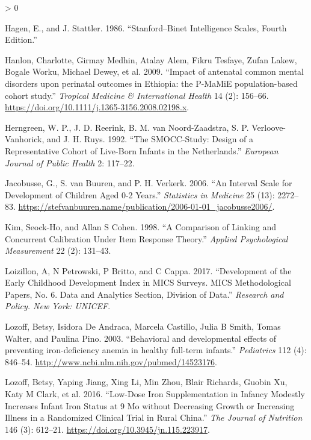 \documentclass[
]{book}
\newlength{\cslhangindent}
\newenvironment{CSLReferences}[2] %
 {%
  \setlength{\parindent}{0pt}
  \ifodd #1 \everypar{\setlength{\hangindent}{\cslhangindent}}\ignorespaces\fi
  \ifnum #2 > 0
  \setlength{\parskip}{#2\baselineskip}
  \fi
 }%
 {}
\begin{document}
\begin{CSLReferences}{1}{0}
\leavevmode\hypertarget{ref-hagen1986}{}%
Hagen, E., and J. Stattler. 1986. {``Stanford--Binet Intelligence Scales, Fourth Edition.''}

\leavevmode\hypertarget{ref-Hanlon2009}{}%
Hanlon, Charlotte, Girmay Medhin, Atalay Alem, Fikru Tesfaye, Zufan Lakew, Bogale Worku, Michael Dewey, et al. 2009. {``{Impact of antenatal common mental disorders upon perinatal outcomes in Ethiopia: the P-MaMiE population-based cohort study}.''} \emph{Tropical Medicine {\&} International Health} 14 (2): 156--66. \url{https://doi.org/10.1111/j.1365-3156.2008.02198.x}.

\leavevmode\hypertarget{ref-herngreen1992}{}%
Herngreen, W. P., J. D. Reerink, B. M. van Noord-Zaadstra, S. P. Verloove-Vanhorick, and J. H. Ruys. 1992. {``The SMOCC-Study: Design of a Representative Cohort of Live-Born Infants in the Netherlands.''} \emph{European Journal of Public Health} 2: 117--22.

\leavevmode\hypertarget{ref-jacobusse2006}{}%
Jacobusse, G., S. van Buuren, and P. H. Verkerk. 2006. {``An Interval Scale for Development of Children Aged 0-2 Years.''} \emph{Statistics in Medicine} 25 (13): 2272--83. \url{https://stefvanbuuren.name/publication/2006-01-01_jacobusse2006/}.

\leavevmode\hypertarget{ref-kim1998}{}%
Kim, Seock-Ho, and Allan S Cohen. 1998. {``A Comparison of Linking and Concurrent Calibration Under Item Response Theory.''} \emph{Applied Psychological Measurement} 22 (2): 131--43.

\leavevmode\hypertarget{ref-loizillon2017}{}%
Loizillon, A, N Petrowski, P Britto, and C Cappa. 2017. {``Development of the Early Childhood Development Index in MICS Surveys. MICS Methodological Papers, No. 6. Data and Analytics Section, Division of Data.''} \emph{Research and Policy. New York: UNICEF}.

\leavevmode\hypertarget{ref-Lozoff2003}{}%
Lozoff, Betsy, Isidora De Andraca, Marcela Castillo, Julia B Smith, Tomas Walter, and Paulina Pino. 2003. {``{Behavioral and developmental effects of preventing iron-deficiency anemia in healthy full-term infants.}''} \emph{Pediatrics} 112 (4): 846--54. \url{http://www.ncbi.nlm.nih.gov/pubmed/14523176}.

\leavevmode\hypertarget{ref-Lozoff2016}{}%
Lozoff, Betsy, Yaping Jiang, Xing Li, Min Zhou, Blair Richards, Guobin Xu, Katy M Clark, et al. 2016. {``{Low-Dose Iron Supplementation in Infancy Modestly Increases Infant Iron Status at 9 Mo without Decreasing Growth or Increasing Illness in a Randomized Clinical Trial in Rural China.}''} \emph{The Journal of Nutrition} 146 (3): 612--21. \url{https://doi.org/10.3945/jn.115.223917}.


\end{CSLReferences}
\end{document}
